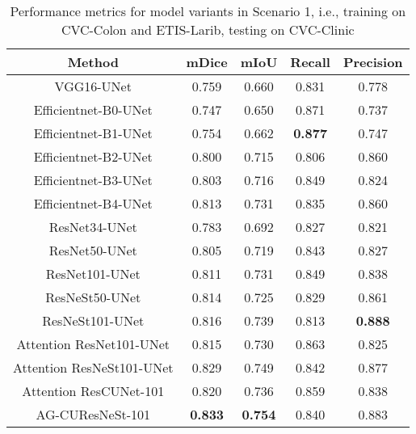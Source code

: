 \documentclass[review, sort&compress]{elsarticle}
\begin{document}
	\begin{table}[h!]
		\centering
		\caption{Performance metrics for model variants in Scenario 1, i.e., training on CVC-Colon and ETIS-Larib, testing on CVC-Clinic}
		\begin{tabular}{ c | c c c c}
			\hline
			Method & mDice       & mIoU    & Recall          & Precision        \\
			\hline
			\hline
			VGG16-UNet & 0.759 &	0.660 &	0.831 &	0.778 \\
			Efficientnet-B0-UNet &	0.747 &	0.650 &	0.871 &	0.737 \\
			Efficientnet-B1-UNet &  0.754 &	0.662 &	\textbf{0.877} &	0.747 \\
			Efficientnet-B2-UNet &	0.800 &	0.715 &	0.806 &	0.860 \\
			Efficientnet-B3-UNet &	0.803 &	0.716 &	0.849 &	0.824 \\
			Efficientnet-B4-UNet &	0.813 &	0.731 &	0.835 &	0.860 \\
			\hline
			\hline
			ResNet34-UNet                  & 0.783          & 0.692          & 0.827          & 0.821           \\
ResNet50-UNet                  & 0.805          & 0.719          & 0.843          & 0.827           \\
ResNet101-UNet                 & 0.811          & 0.731          & 0.849          & 0.838           \\
ResNeSt50-UNet                 & 0.814          & 0.725          & 0.829          & 0.861           \\
ResNeSt101-UNet                & 0.816          & 0.739          & 0.813          & \textbf{0.888}           \\
			\hline
			\hline
			Attention ResNet101-UNet          & 0.815          & 0.730          & 0.863          & 0.825           \\
Attention ResNeSt101-UNet       & 0.829          & 0.749          & 0.842          & 0.877           \\
			\hline
			\hline
			Attention ResCUNet-101          & 0.820          & 0.736          & 0.859          & 0.838           \\
AG-CUResNeSt-101 & \textbf{0.833} & \textbf{0.754} & 0.840 & 0.883  \\
\hline
		\end{tabular}
		\label{tab_colon_etis_clinic}
	\end{table}
	
\end{document}
